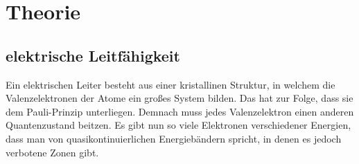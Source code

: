 \section{Theorie}
\label{sec:Theorie}
\subsection{elektrische Leitfähigkeit}

Ein elektrischen Leiter besteht aus einer kristallinen Struktur, in welchem die Valenzelektronen der Atome
ein großes System bilden. Das hat zur Folge, dass sie dem Pauli-Prinzip unterliegen. Demnach muss jedes 
Valenzelektron einen anderen Quantenzustand beitzen. Es gibt nun so viele Elektronen verschiedener Energien,
dass man von quasikontinuierlichen Energiebändern spricht, in denen es jedoch verbotene Zonen gibt.
